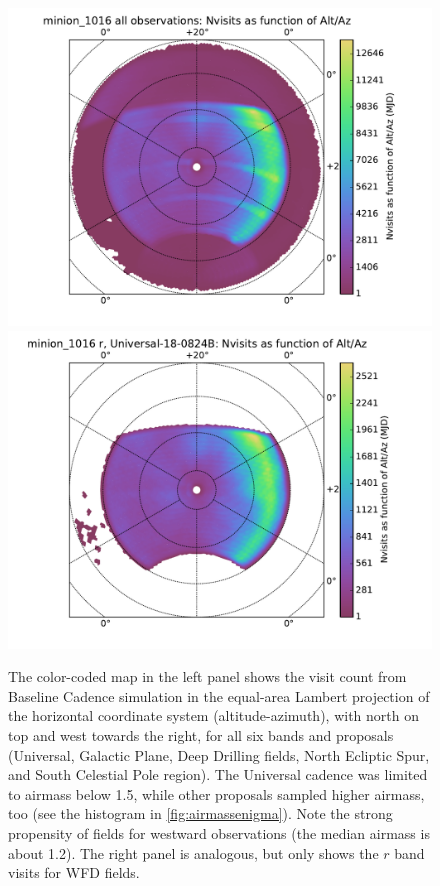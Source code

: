 \begin{figure}[t!]
\vskip -0.0in
\includegraphics[angle=0,width=0.49\hsize,clip]{figs/cadence/minion_1016_Nvisits_as_function_of_Alt_Az_all_observations_HEAL_SkyMap.pdf}
\includegraphics[angle=0,width=0.49\hsize,clip]{figs/cadence/minion_1016_Nvisits_as_function_of_Alt_Az_r_Universal-18-0824B_HEAL_SkyMap.pdf}
\vskip -0.1in
\caption{The color-coded map in the left panel shows the visit count from
Baseline Cadence simulation  in the equal-area Lambert projection of the
horizontal coordinate system (altitude-azimuth), with north on top and west towards the
right, for all six bands and proposals (Universal, Galactic Plane, Deep Drilling
fields, North Ecliptic Spur, and South Celestial Pole region). The Universal cadence was
limited to airmass below 1.5, while other proposals sampled higher airmass, too (see the
histogram in \autoref{fig:airmassenigma}).  Note the strong propensity of fields
for westward observations (the median airmass is about 1.2). The right panel is analogous,
but only shows the $r$ band visits for WFD fields.}
\label{fig:AltAzenigma}
\end{figure}







